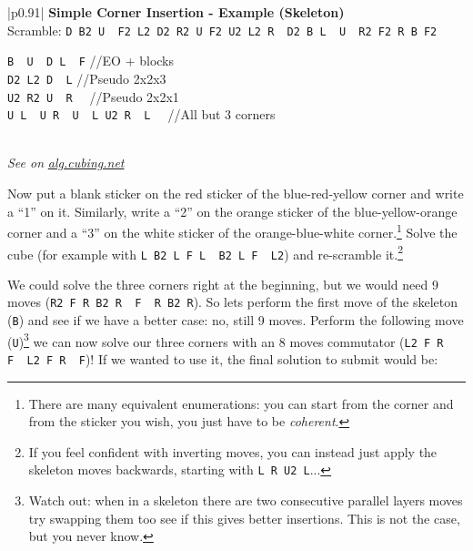 \documentclass[11pt,a4paper]{book}
\newcommand{\p}{\textquotesingle}
\newcommand{\m}{\texttt}
\newcommand{\ps}{\p\,\,}
\newcommand{\comment}[1]{{\color{gray}\quad//#1}}
\begin{document}
\bigskip
\begin{tabular}{|p{}|}
\hline
\textbf{Simple Corner Insertion - Example (Skeleton)}\\
\hline
Scramble: \m{D B2 U\ps F2 L2 D2 R2 U F2 U2 L2 R\ps D2 B L\ps U\ps R2 F2 R B F2}\\
\hline
\begin{minipage}[l]{0.650\textwidth}
\m{B\ps U\ps D L\ps F\p} \comment{EO + blocks}\\
\m{D2 L2 D\ps L} \comment{Pseudo 2x2x3}\\
\m{U2 R2 U\ps R\ps} \comment{Pseudo 2x2x1}\\
\m{U L\ps U R\ps U\ps L U2 R\ps L\ps} \comment{All but 3 corners}
\end{minipage}
\begin{minipage}[c]{0.25\textwidth}

\end{minipage}\\
\hline
\emph{See on }\href{https://alg.cubing.net/?setup=D_B2_U-_F2_L2_D2_R2_U_F2_U2_L2_R-_D2_B_L-_U-_R2_F2_R_B_F2&alg=B-_U-_D_L-_F-_\%2F\%2FEO_\%26\%232b\%3B_blocks\%0AD2_L2_D-_L_\%2F\%2FPseudo1_2x2x3\%0AU2_R2_U-_R-_\%2F\%2FPseudo_2x2x1\%0AU_L-_U_R-_U-_L_U2_R-_L-_\%2F\%2FAll_but_3_corners}{\emph{alg.cubing.net}}\\
\hline
\end{tabular}
\bigskip

Now put a blank sticker on the red sticker of the blue-red-yellow corner and write a ``1'' on it. Similarly, write a ``2'' on the orange sticker of the blue-yellow-orange corner and a ``3'' on the white sticker of the orange-blue-white corner.\footnote{There are many equivalent enumerations: you can start from the corner and from the sticker you wish, you just have to be \emph{coherent}.} Solve the cube (for example with \m{L B2 L F L\ps B2 L F\ps L2}) and re-scramble it.\footnote{If you feel confident with inverting moves, you can instead just apply the skeleton moves backwards, starting with \m{L R U2 L\p}...}

We could solve the three corners right at the beginning, but we would need 9 moves (\m{R2 F R B2 R\ps F\ps R B2 R}). So lets perform the first move of the skeleton (\m{B\p}) and see if we have a better case: no, still 9 moves. Perform the following move (\m{U\p})\footnote{Watch out: when in a skeleton there are two consecutive parallel layers moves try swapping them too see if this gives better insertions. This is not the case, but you never know.} we can now solve our three corners with an 8 moves commutator (\m{L2 F R F\ps L2 F R\ps F\p})! If we wanted to use it, the final solution to submit would be:
\end{document}
